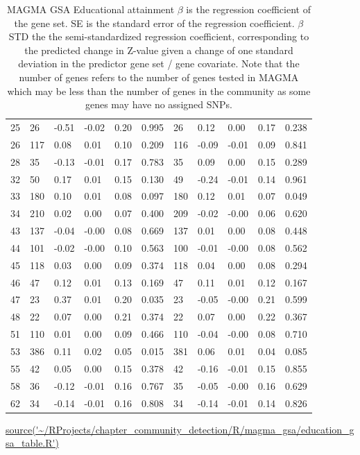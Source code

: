 \begin{table}[ht]
\begin{tabular}{cllllllllll}
  25 & 26 & -0.51 & -0.02 & 0.20 & 0.995 & 26 & 0.12 & 0.00 & 0.17 & 0.238 \\ 
  26 & 117 & 0.08 & 0.01 & 0.10 & 0.209 & 116 & -0.09 & -0.01 & 0.09 & 0.841 \\ 
  28 & 35 & -0.13 & -0.01 & 0.17 & 0.783 & 35 & 0.09 & 0.00 & 0.15 & 0.289 \\ 
  32 & 50 & 0.17 & 0.01 & 0.15 & 0.130 & 49 & -0.24 & -0.01 & 0.14 & 0.961 \\ 
  33 & 180 & 0.10 & 0.01 & 0.08 & 0.097 & 180 & 0.12 & 0.01 & 0.07 & 0.049 \\ 
  34 & 210 & 0.02 & 0.00 & 0.07 & 0.400 & 209 & -0.02 & -0.00 & 0.06 & 0.620 \\ 
  43 & 137 & -0.04 & -0.00 & 0.08 & 0.669 & 137 & 0.01 & 0.00 & 0.08 & 0.448 \\ 
  44 & 101 & -0.02 & -0.00 & 0.10 & 0.563 & 100 & -0.01 & -0.00 & 0.08 & 0.562 \\ 
  45 & 118 & 0.03 & 0.00 & 0.09 & 0.374 & 118 & 0.04 & 0.00 & 0.08 & 0.294 \\ 
  46 & 47 & 0.12 & 0.01 & 0.13 & 0.169 & 47 & 0.11 & 0.01 & 0.12 & 0.167 \\ 
  47 & 23 & 0.37 & 0.01 & 0.20 & 0.035 & 23 & -0.05 & -0.00 & 0.21 & 0.599 \\ 
  48 & 22 & 0.07 & 0.00 & 0.21 & 0.374 & 22 & 0.07 & 0.00 & 0.22 & 0.367 \\ 
  51 & 110 & 0.01 & 0.00 & 0.09 & 0.466 & 110 & -0.04 & -0.00 & 0.08 & 0.710 \\ 
  53 & 386 & 0.11 & 0.02 & 0.05 & 0.015 & 381 & 0.06 & 0.01 & 0.04 & 0.085 \\ 
  55 & 42 & 0.05 & 0.00 & 0.15 & 0.378 & 42 & -0.16 & -0.01 & 0.15 & 0.855 \\ 
  58 & 36 & -0.12 & -0.01 & 0.16 & 0.767 & 35 & -0.05 & -0.00 & 0.16 & 0.629 \\ 
  62 & 34 & -0.14 & -0.01 & 0.16 & 0.808 & 34 & -0.14 & -0.01 & 0.14 & 0.826 \\ 
   \bottomrule
\end{tabular}
\caption[MAGMA GSA Educational attainment]{MAGMA GSA Educational attainment  $\beta$ is the regression coefficient of the gene set. SE is the standard error of the regression coefficient. $\beta$ STD the the semi-standardized regression coefficient, corresponding to the predicted
change in Z-value given a change of one standard deviation in the predictor gene set / gene covariate. Note that the number of genes refers to the number of genes tested in MAGMA which may be less than the number of genes in the community as some genes may have no assigned SNPs. } 
    \tiny\url{source('~/RProjects/chapter_community_detection/R/magma_gsa/education_gsa_table.R')}
\label{tab:MAGMA GSA Education  BE}
\end{table}

